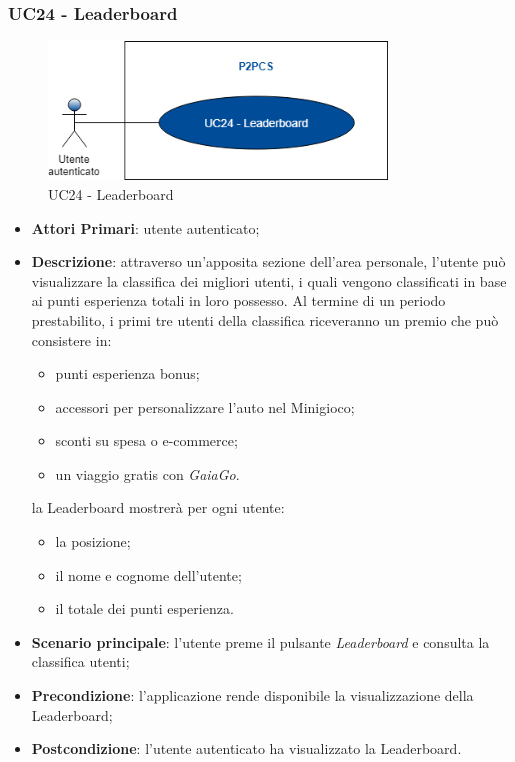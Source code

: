 \subsubsection{UC24 - Leaderboard}
\begin{figure}[h]
	\includegraphics[width=9cm]{res/images/UC22Leaderboard.png}
	\centering
	\caption{UC24 - Leaderboard}
\end{figure}
\begin{itemize}
	\item \textbf{Attori Primari}: utente autenticato;
	\item \textbf{Descrizione}: attraverso un'apposita sezione dell'area personale, l'utente può visualizzare la classifica dei migliori utenti, i quali vengono classificati in base ai punti esperienza totali in loro possesso. Al termine di un periodo prestabilito, i primi tre utenti della classifica riceveranno un premio che può consistere in:
	\begin{itemize}
		\item punti esperienza bonus;
		\item accessori per personalizzare l'auto nel Minigioco;
		\item sconti su spesa o e-commerce;
		\item un viaggio gratis con \textit{GaiaGo}.
	\end{itemize}
	la Leaderboard mostrerà per ogni utente:
	\begin{itemize}
		\item la posizione;
		\item il nome e cognome dell'utente;
		\item il totale dei punti esperienza.
	\end{itemize}
	\item \textbf{Scenario principale}: l'utente preme il pulsante \textit{Leaderboard} e consulta la classifica utenti;
	\item \textbf{Precondizione}: l'applicazione rende disponibile la visualizzazione della Leaderboard\glo;
	\item \textbf{Postcondizione}: l'utente autenticato ha visualizzato la Leaderboard.
\end{itemize}

